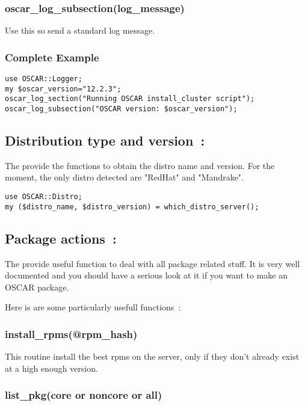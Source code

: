 \subsubsection{oscar\_log\_subsection(log\_message)}

Use this so send a standard log message.

\subsubsection{Complete Example}

\begin{verbatim}
use OSCAR::Logger;
my $oscar_version="12.2.3";
oscar_log_section("Running OSCAR install_cluster script");
oscar_log_subsection("OSCAR version: $oscar_version");
\end{verbatim}

\subsection{Distribution type and version~:}

The  provide the functions to obtain the distro name and
version. For the moment, the only distro detected are "RedHat" and "Mandrake".

\begin{verbatim}
use OSCAR::Distro;
my ($distro_name, $distro_version) = which_distro_server();
\end{verbatim}

\subsection{Package actions~: }

The  provide useful function to deal with all package
related stuff. It is very well documented and you should have a serious look
at it if you want to make an OSCAR package.

Here is are some particularly usefull functions~:

\subsubsection{install\_rpms(@rpm\_hash)}

This routine install the best rpms on the server, only if
they don't already exist at a high enough version.

\subsubsection{list\_pkg(core or noncore or all)}

